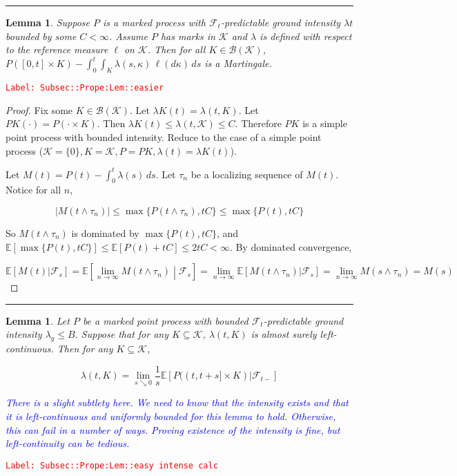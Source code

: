 \documentclass[12pt]{article}
\newcommand{\mb}{\mathbb}
\newcommand{\mc}{\mathcal}
\newcommand{\ms}{\mathscr}
\newcommand{\ra}{\rightarrow}
\newcommand{\tr}{\textcolor{red}}
\newcommand{\tb}{\textcolor{blue}}
\newcommand{\labe}[1]{\tr{\texttt{Label: #1}}}
\newcommand{\lin}{\rule{\linewidth}{0.4 pt}}
\newcommand{\ex}[1]{\mb{E}\left[#1\right]}			%
\renewcommand{\S}{S}							%
\renewcommand{\t}{t}							%
\renewcommand{\tt}{s}							%
\newcommand{\F}{\mc{F}}							%
\newcommand{\ts}[1]{_{#1}}						%
\newcommand{\const}{C}							%
\newcommand{\Sm}{\ell}							%
\newcommand{\rate}{\lambda}						%
\newcommand{\indx}[1]{_{#1}}					%
\newcommand{\rt}{\tau}							%
\renewcommand{\mark}{\kappa}					%
\newcommand{\rp}{P}								%
\newcommand{\mspce}{\mc{K}}						%
\newtheorem{lem}[thms]{Lemma}
\begin{document}
\lin

\begin{lem}
Suppose \(\rp\) is a marked process with \(\F\ts{\t}\)-predictable ground intensity \(\rate{\t}\) bounded by some \(\const < \infty\). Assume \(\rp\) has marks in \(\mspce\) and \(\rate\) is defined with respect to the reference measure \(\Sm\) on \(\mspce\). Then for all \(K \in \ms{B}(\mspce)\), \(\rp([0,\t]\times K) - \int_0^\t\int_K \rate(\tt,\mark)\,\ell(d\mark)\,ds\) is a Martingale.
\label{Subsec::Prope:Lem::easier}
\end{lem}
\labe{Subsec::Prope:Lem::easier}

\begin{proof}
Fix some \(K \in \ms{B}(\mspce)\). Let \(\rate{K}(\t) = \rate(\t,K)\). Let \(\rp{K}(\cdot) = \rp(\cdot\times K)\). Then \(\rate{K}(\t) \leq \rate(\t,\mspce) \leq \const\). Therefore \(\rp{K}\) is a simple point process with bounded intensity. Reduce to the case of a simple point process (\(\mspce = \{0\}, K = \mspce, \rp = \rp{K},\rate(\t) = \rate{K}(\t)\)).

Let \(M(\t) = \rp(\t) - \int_0^\t \rate(\tt)\,ds\). Let \(\rt\indx{n}\) be a localizing sequence of \(M(\t)\). Notice for all \(n\),

\[|M(\t\wedge \rt\indx{n})| \leq \max\{\rp(\t\wedge \rt\indx{n}),\t\const\}\leq \max\{\rp(\t),\t\const\}\]

So \(M(\t\wedge\rt\indx{n})\) is dominated by \(\max\{\rp(\t),\t\const\}\), and \(\ex{\max\{\rp(\t),\t\const\}} \leq \ex{\rp(\t) + \t\const} \leq 2\t\const < \infty\). By dominated convergence,

\[\ex{M(\t)|\F\ts{\tt}} = \ex{\lim_{n\ra\infty} M(\t\wedge \rt\indx{n})\middle|\F\ts{\tt}} = \lim_{n\ra\infty}\ex{M(\t\wedge \rt\indx{n})|\F\ts{\tt}} = \lim_{n\ra\infty} M(\tt\wedge \rt\indx{n}) = M(\tt)\]
\end{proof}

\lin

\begin{lem}
Let \(\rp\) be a marked point process with bounded \(\F\ts{\t}\)-predictable ground intensity \(\rate_g\leq B\). Suppose that for any \(K \subseteq \mspce\), \(\rate(\t,K)\) is almost surely left-continuous. Then for any \(K \subseteq \mspce\),

\[\rate(\t,K) = \lim_{s\searrow 0}\frac{1}{\tt}\ex{\rp((\t,\t+\tt]\times K)|\F\ts{\t-}}\]

\tb{There is a slight subtlety here. We need to know that the intensity exists and that it is left-continuous and uniformly bounded for this lemma to hold. Otherwise, this can fail in a number of ways. Proving existence of the intensity is fine, but left-continuity can be tedious.}

\label{Subsec::Prope:Lem::easy intense calc}
\end{lem}
\labe{Subsec::Prope:Lem::easy intense calc}
\end{document}
